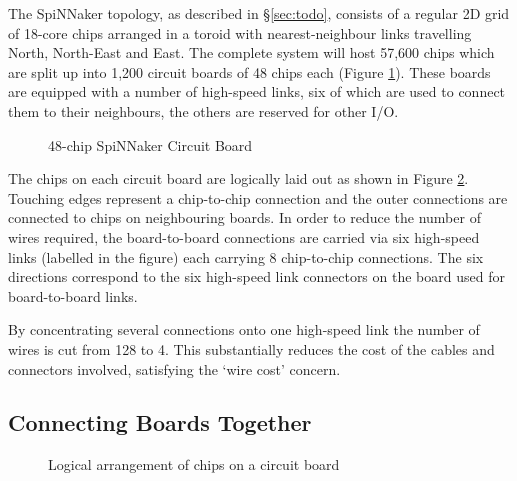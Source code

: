 			
			
			The SpiNNaker topology, as described in \S\ref{sec:todo}, consists of a
			regular 2D grid of 18-core chips arranged in a toroid with
			nearest-neighbour links travelling North, North-East and East. The
			complete system will host 57,600 chips which are split up into 1,200
			circuit boards of 48 chips each (Figure \ref{fig:spinn4labelled}). These
			boards are equipped with a number of high-speed links, six of which are
			used to connect them to their neighbours, the others are reserved for
			other I/O.
			
			\begin{figure}
				\center
				
				\caption{48-chip SpiNNaker Circuit Board}
				\label{fig:spinn4labelled}
			\end{figure}
			
			The chips on each circuit board are logically laid out as shown in Figure
			\ref{fig:chipsOnBoard}. Touching edges represent a chip-to-chip connection
			and the outer connections are connected to chips on neighbouring boards.
			In order to reduce the number of wires required, the board-to-board
			connections are carried via six high-speed links (labelled in the figure)
			each carrying 8 chip-to-chip connections. The six directions correspond to
			the six high-speed link connectors on the board used for board-to-board
			links.
			
			By concentrating several connections onto one high-speed link the number
			of wires is cut from 128 to 4. This substantially reduces the cost of the
			cables and connectors involved, satisfying the `wire cost' concern.
		
		\subsection{Connecting Boards Together}
			
			\label{ref:connectingBoardsTogether}
			
			\begin{figure}
				\center
				
				\caption{Logical arrangement of chips on a circuit board}
				\label{fig:chipsOnBoard}
			\end{figure}
			
